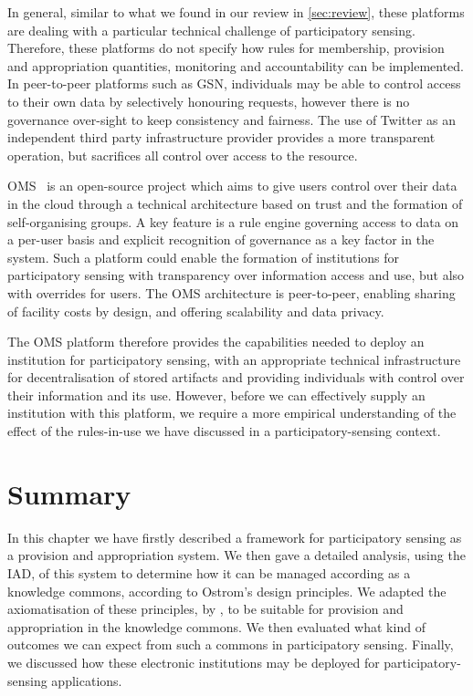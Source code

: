 In general, similar to what we found in our review in \autoref{sec:review}, these platforms are dealing with a particular technical challenge of participatory sensing. 
Therefore, these platforms do not specify how rules for membership, provision and appropriation quantities, monitoring and accountability can be implemented. 
In peer-to-peer platforms such as \ac{GSN}, individuals may be able to control access to their own data by selectively honouring requests, however there is no governance over-sight to keep consistency and fairness. 
The use of Twitter as an independent third party infrastructure provider provides a more transparent operation, but sacrifices all control over access to the resource.

\ac{OMS}~\citep{Hardjono2014,Hardjono2014a} is an open-source project which aims to give users control over their data in the cloud through a technical architecture based on trust and the formation of self-organising groups. 
A key feature is a rule engine governing access to data on a per-user basis and explicit recognition of governance as a key factor in the system.
Such a platform could enable the formation of institutions for participatory sensing with transparency over information access and use, but also with overrides for users. 
The \ac{OMS} architecture is peer-to-peer, enabling sharing of facility costs by design, and offering scalability and data privacy. 


The \ac{OMS} platform therefore provides the capabilities needed to deploy an
institution for participatory sensing, with an appropriate technical
infrastructure for decentralisation of stored artifacts and providing
individuals with control over their information and its use. However, before
we can effectively supply an institution with this platform, we require a more
empirical understanding of the effect of the rules-in-use we have discussed in
a participatory-sensing context.

\section{Summary}\label{sec:conclude}

In this chapter we have firstly described a framework for participatory sensing as a provision and appropriation system. We then gave a detailed analysis, using the \ac{IAD}, of this system to determine how it can be managed according as a knowledge commons, according to Ostrom's design principles. We adapted the axiomatisation of these principles, by \citet{Pitt2012b}, to be suitable for provision and appropriation in the knowledge commons. We then evaluated what kind of outcomes we can expect from such a commons in participatory sensing. Finally, we discussed how these electronic institutions may be deployed for participatory-sensing applications.

